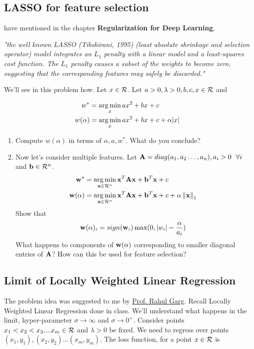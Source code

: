 \subsection{LASSO for feature selection}

\cite{Goodfellow-et-al-2016} have mentioned in the chapter \textbf{Regularization for Deep Learning}, 
\begin{center}
     \textit{"the well known LASSO (Tibshirani, 1995) (least absolute shrinkage and selection operator) model integrates an $L_1$ penalty with a linear model and a least-squares cost function. The $L_1$ penalty causes a subset of the weights to become zero, suggesting that the corresponding features may safely be discarded."}
\end{center}


We'll see in this problem how. Let $x \in \mathcal{R}$. Let $a > 0, \lambda > 0, b, c, x \in \mathcal{R}$ and 

\begin{align*}
w^* &=\operatorname*{arg\,min}_{x} ax^2 + bx + c\\
w(\alpha) &= \operatorname*{arg\,min}_{x} ax^2 + bx + c + \alpha |x|\\
\end{align*}

\begin{enumerate}[label=\alph*)]
\item Compute $w(\alpha)$ in terms of $\alpha, a, w^*$. What do you conclude?

\item Now let's consider multiple features. Let $\mA = diag(a_1, a_2\hdots, a_n), a_i > 0 \ \ \forall i$ and $\mathbf{b} \in \mathcal{R}^n$. 
\begin{align*}
    \mathbf{w}^* &= \operatorname*{arg\,min}_{\mathbf{x} \in \mathcal{R}^n} \mathbf{x}^T \mathbf{A} \mathbf{x} + \mathbf{b}^T \mathbf{x} + c\\
    \mathbf{w}(\alpha) &= \operatorname*{arg\,min}_{\mathbf{x} \in \mathcal{R}^n} \mathbf{x}^T \mathbf{A} \mathbf{x} + \mathbf{b}^T \mathbf{x} + c + \alpha\left\lVert\mathbf{x}\right\rVert_1\\   
\end{align*}
Show that 
\begin{equation*}
    \mathbf{w}(\alpha)_i = sign(\mathbf{w}_i)\max(0, |w_i| - \frac{\alpha}{a_i})
\end{equation*}
What happens to components of $\mathbf{w}(\alpha)$ corresponding to smaller diagonal entries of $\mathbf{A}$? How can this be used for feature selection?
\end{enumerate}




\subsection{Limit of Locally Weighted Linear Regression}
The problem idea was suggested to me by \href{https://www.cse.iitd.ac.in/~rahulgarg/}{Prof. Rahul Garg}. Recall Locally Weighted Linear Regression done in class. We'll understand what happens in the limit, hyper-parameter $\sigma \to \infty$ and $\sigma \to 0^+$. 
Consider points $x_1 <  x_2 < x_3....x_m \in \mathcal{R}$ and $\lambda > 0$ be fixed. We need to regress over points $(x_1, y_1), (x_2, y_2) \hdots (x_m, y_m)$. 
The loss function, for a point $x \in \mathcal{R}$ is

